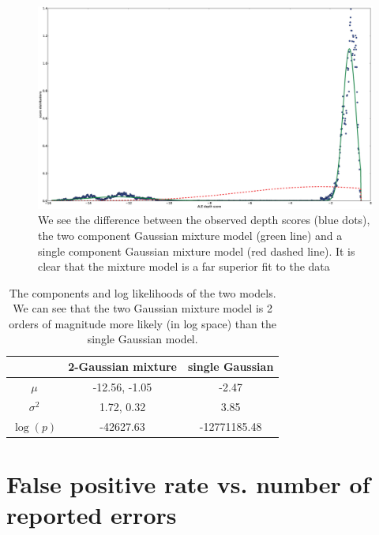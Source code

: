 \documentclass[phd,tocprelim]{cornell}
\begin{document}
\begin{figure}[hpt]
 	\centerline{\includegraphics[width=\textwidth]{figures/ALE/gmm_spiro_depth.png}}
    \caption[Example of GMM for ALE depth score]{We see the difference between the observed depth scores (blue dots), the two component Gaussian mixture model (green line) and a single component Gaussian mixture model (red dashed line). It is clear that the mixture model is a far superior fit to the data}
 	\label{fig:GMM_spiro}
\end{figure}

\begin{table}[hpt]

    \begin{center}
    \begin{tabular}{c|c|c}
        & 2-Gaussian mixture & single Gaussian \\
        \hline
        $\mu$ & -12.56, -1.05 & -2.47 \\
        $\sigma^{2}$ & 1.72, 0.32& 3.85 \\
        $\log(p)$ & -42627.63 & -12771185.48
    \end{tabular}
\end{center}
\caption[Example of GMM for ALE depth score]{The components and log likelihoods of the two models. We can see that the two Gaussian mixture model is 2 orders of magnitude more likely (in log space) than the single Gaussian model.}
\label{tab:GMM_spiro}
\end{table}

\section{False positive rate vs. number of reported errors}
\label{ROCALE}
\end{document}
